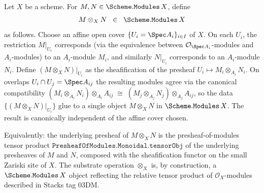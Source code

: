 \begin{definition}


  \label{def:scheme_modules_tensorobj}
  Let \(X\) be a scheme. For
  \(M, N \in \Scheme.\mathtt{Modules}\,X\), define
  \[
    M \otimes_X N \;\;\in\;\; \Scheme.\mathtt{Modules}\,X
  \]
  as follows. Choose an affine open cover \(\{U_i = \Spec A_i\}_{i \in I}\)
  of \(X\). On each \(U_i\), the restriction
  \(M|_{U_i}\) corresponds (via the equivalence between
  \(\mathcal{O}_{\Spec A_i}\)-modules and \(A_i\)-modules) to an
  \(A_i\)-module \(M_i\), and similarly
  \(N|_{U_i}\) corresponds to an \(A_i\)-module \(N_i\). Define
  \((M \otimes_X N)|_{U_i}\) as the sheafification of the presheaf
  \(U_i \mapsto M_i \otimes_{A_i} N_i\). On overlaps
  \(U_i \cap U_j = \Spec A_{ij}\) the resulting modules agree via the
  canonical compatibility
  \((M_i \otimes_{A_i} N_i) \otimes_{A_i} A_{ij}
     \;\cong\;
     (M_j \otimes_{A_j} N_j) \otimes_{A_j} A_{ij}\),
  so the data \(\{(M \otimes_X N)|_{U_i}\}\) glue to a single object
  \(M \otimes_X N\) in \(\Scheme.\mathtt{Modules}\,X\). The result is
  canonically independent of the affine cover chosen.

  Equivalently: the underlying presheaf of \(M \otimes_X N\) is the
  presheaf-of-modules tensor product
  \(\mathtt{PresheafOfModules.Monoidal.tensorObj}\) of the underlying
  presheaves of \(M\) and \(N\), composed with the sheafification
  functor on the small Zariski site of \(X\). The substrate operation
  \(\otimes_X\) is, by construction, a \(\Scheme.\mathtt{Modules}\,X\)
  object reflecting the relative tensor product of
  \(\mathcal{O}_X\)-modules described in Stacks tag 03DM.
\end{definition}

